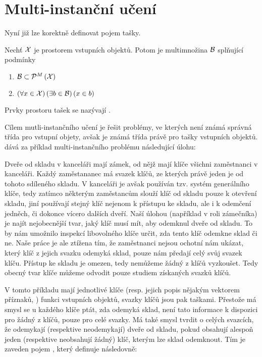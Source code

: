 \section{Multi-instanční učení}

Nyní již lze korektně definovat pojem tašky.

\begin{define}
	Nechť \( \mathcal X \) je prostorem vstupních objektů. Potom  je multimnožina \( \mathcal B \) splňující podmínky 
	\begin{enumerate}
		\item \( \mathcal B \subset \mathcal P^M \left( \mathcal X \right) \)
		\item \( \left( \forall x \in \mathcal X \right) \left( \exists b \in \mathcal B \right) \left( x \in b \right) \)
	\end{enumerate}
	Prvky prostoru tašek se nazývají .
\end{define}

Cílem mutli-instančního učení je řešit problémy, ve kterých není známá správná třída pro vstupní objety, avšak je známá třída právě pro tašky vstupních objektů. \cite{dietterich_solving_1997} dává za příklad multi-instančního problému následující úlohu:

\begin{example}
	Dveře od skladu v kanceláři mají zámek, od nějž mají klíče všichni zaměstnanci v kanceláři. Každý zaměstananec má svazek klíčů, ze kterých právě jeden je od tohoto sdíleného skladu. V kanceláři je avšak používán tzv. systém generálního klíče, tedy zatímco některým zaměstancům slouží klíč od skladu pouze k otevření skladu, jiní používají stejný klíč nejenom k přístupu ke skladu, ale i k odemčení jedněch, či dokonce vícero dalších dveří. Naší úlohou (například v roli zámečníka) je najít nejobecnější tvar, jaký klíč musí mít, aby odemknul dveře od skladu. To by nám umožnilo inspekcí libovolného klíče určit, zda tento klíč odemkne sklad či ne. Naše práce je ale ztížena tím, že zaměstnanci nejsou ochotní nám ukázat, který klíč z jejich svazku odemyká sklad, pouze nám předají celý svůj svazek klíču. Přístup ke skladu je omezen, tedy nemůžeme žádný z klíčů vyzkoušet. Tedy obecný tvar klíče můžeme odvodit pouze studiem získaných svazků klíčů.
\end{example}

V tomto příkladu mají jednotlivé klíče (resp. jejich popis nějakým vektorem příznaků, ) funkci vstupních objektů, svazky klíčů jsou pak taškami. Přestože má smysl se u každého klíče ptát, zda odemyká sklad, není tato informace k dispozici pro žádný z klíčů, pouze pro celé svazky. Má také smysl tvrdit o celých svazcích, že odemykají (respektive neodemykají) dveře od skladu, pokud obsahují alespoň jeden (respektive neobsahují žádný) klíč, kterým lze sklad odemknout. Tím je zaveden pojem , který \cite{dietterich_solving_1997} definuje následovně:

